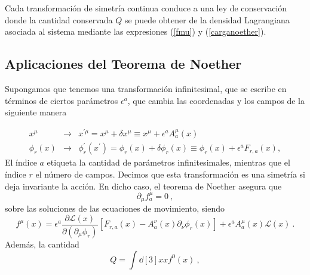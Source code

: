 \begin{theorem}
Cada transformación de simetría continua conduce a una ley de conservación donde la cantidad conservada $Q$ se puede obtener de la densidad Lagrangiana asociada al sistema mediante las expresiones (\ref{fmu}) y (\ref{carganoether}).
\end{theorem}

\vspace{0.4cm}
\subsection{Aplicaciones del Teorema de Noether}
\vspace{0.2cm}

Supongamos que tenemos una transformación infinitesimal, que se escribe en términos de ciertos parámetros $\epsilon^{a}$, que cambia las coordenadas y los campos de la siguiente manera

\begin{eqnarray}
x^{\mu } &\rightarrow &x^{\prime \mu }=x^{\mu }+\delta x^{\mu }\equiv x^{\mu}+\epsilon ^{a}A_{a}^{\mu }\left( x\right) \label{xmue} \\
\phi _{r}\left( x\right)  &\rightarrow &\phi _{r}^{\prime }\left( x^{\prime}\right) =\phi _{r}\left( x\right) +\delta \phi _{r}\left( x\right) \equiv \phi_{r}\left( x\right) +\epsilon ^{a}F_{r,a}\left( x \right) \label{fmue} ,
\end{eqnarray}
\noindent
El índice $a$ etiqueta la cantidad de parámetros infinitesimales, mientras que el índice $r$ el número de campos. Decimos que esta transformación es una simetría si deja invariante la acción.  En dicho caso, el teorema de Noether asegura que
\begin{equation}
    \partial_{\mu} f^{\mu}_{a}=0~,
\end{equation}
sobre las soluciones de las ecuaciones de movimiento, siendo
\begin{equation}
f^{\mu }(x)=\epsilon^{a}\frac{\partial \mathcal{L}\left( x\right) }{\partial \left(
\partial _{\mu }\phi _{r}\right) }\left[ F_{r,a}\left( x\right) -A_{a}^{\nu
}\left( x\right) \partial _{\nu }\phi _{r}\left( x\right) \right]
+\epsilon^{a} A_{a}^{\mu }\left( x\right) \mathcal{L}\left( x\right) ~.
\end{equation}
Además, la cantidad
\begin{equation}
    Q=\int \dd[3]{x} x f^{0}(x)~,
    \label{eq_2.100}
\end{equation}

